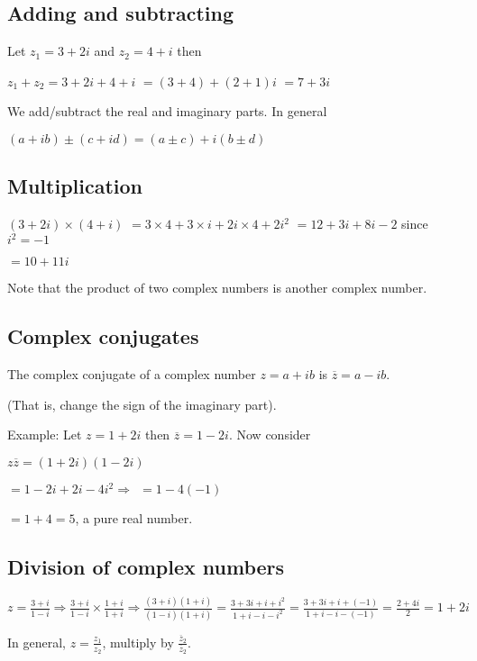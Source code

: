 \documentclass{extarticle}
\begin{document}
\subsection{Adding and subtracting}

Let $z_1=3+2i$ and $z_2=4+i$ then

$z_1+z_2=3+2i+4+i$
$=\left(3+4\right)+\left(2+1\right)i$
$=7+3i$


We add/subtract the real and imaginary parts.
In general

$\left(a+ib\right)\pm\left(c+id\right)=\left(a\pm c\right)+i\left(b\pm d\right)$

\subsection{Multiplication}

$\left(3+2i\right)\times\left(4+i\right)$ $=3\times4+3\times i+2i\times4+2i^2$ $=12+3i+8i-2$
since $i^2=-1$

$=10+11i$

Note that the product of two complex numbers is another complex number.


\subsection{Complex conjugates}

The complex conjugate of a complex number $z=a+ib$ is $\overline{z}=a-ib$. 

(That is, change the sign of the imaginary part).

Example: Let $z=1+2i$ then $\overline{z}=1-2i$. Now consider

$z\overline{z}=\left(1+2i\right)\left(1-2i\right)$

$=1-2i+2i-4i^2\Rightarrow\ \ =1-4\left(-1\right)$

$=1+4=5$, a pure real number.



\subsection{Division of complex numbers}

$z=\frac{3+i}{1-i}\Rightarrow\frac{3+i}{1-i}\times\frac{1+i}{1+i}\Rightarrow\frac{\left(3+i\right)\left(1+i\right)}{\left(1-i\right)\left(1+i\right)}=\frac{3+3i+i+i^2}{1+i-i-i^2}=\frac{3+3i+i+(-1)}{1+i-i-(-1)}=\frac{2+4i}{2}=1+2i$

In general, $z=\frac{z_1}{z_2}$, multiply by $\frac{{\overline{z}}_2}{{\overline{z}}_2}$.
\end{document}
